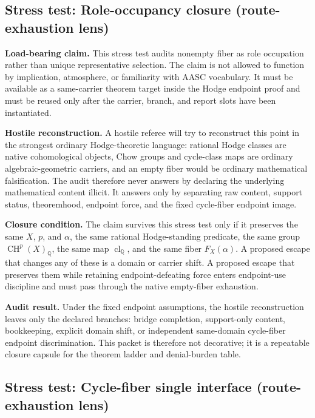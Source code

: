 \documentclass[11pt]{article}
\newcommand{\QQ}{\mathbb{Q}}
\newcommand{\CH}{\operatorname{CH}}
\newcommand{\clQ}{\operatorname{cl}_{\QQ}}
\begin{document}
\subsection{Stress test: Role-occupancy closure (route-exhaustion lens)}

\par\noindent\textbf{Load-bearing claim.} This stress test audits nonempty fiber as role occupation rather than unique representative selection. The claim is not allowed to function by implication, atmosphere, or familiarity with AASC vocabulary. It must be available as a same-carrier theorem target inside the Hodge endpoint proof and must be reused only after the carrier, branch, and report slots have been instantiated.

\par\noindent\textbf{Hostile reconstruction.} A hostile referee will try to reconstruct this point in the strongest ordinary Hodge-theoretic language: rational Hodge classes are native cohomological objects, Chow groups and cycle-class maps are ordinary algebraic-geometric carriers, and an empty fiber would be ordinary mathematical falsification. The audit therefore never answers by declaring the underlying mathematical content illicit. It answers only by separating raw content, support status, theoremhood, endpoint force, and the fixed cycle-fiber endpoint image.

\par\noindent\textbf{Closure condition.} The claim survives this stress test only if it preserves the same $X$, $p$, and $\alpha$, the same rational Hodge-standing predicate, the same group $\CH^p(X)_\QQ$, the same map $\clQ$, and the same fiber $F_X(\alpha)$. A proposed escape that changes any of these is a domain or carrier shift. A proposed escape that preserves them while retaining endpoint-defeating force enters endpoint-use discipline and must pass through the native empty-fiber exhaustion.

\par\noindent\textbf{Audit result.} Under the fixed endpoint assumptions, the hostile reconstruction leaves only the declared branches: bridge completion, support-only content, bookkeeping, explicit domain shift, or independent same-domain cycle-fiber endpoint discrimination. This packet is therefore not decorative; it is a repeatable closure capsule for the theorem ladder and denial-burden table.


\subsection{Stress test: Cycle-fiber single interface (route-exhaustion lens)}
\end{document}
